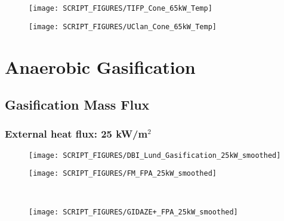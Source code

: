 \begin{landscape}
\begin{minipage}{0.65\textwidth}
\begin{figure}[H]
{\texttt{[image: SCRIPT\_FIGURES/TIFP\_Cone\_65kW\_Temp]}}\\
\end{figure}
\end{minipage}
\begin{minipage}{0.35\textwidth}
\begin{figure}[H]
{\texttt{[image: SCRIPT\_FIGURES/UClan\_Cone\_65kW\_Temp]}}\\
\end{figure}
\end{minipage}
\vfill

\section{Anaerobic Gasification}
\subsection{Gasification Mass Flux}
\label{Gas_Mass}
\subsubsection{External heat flux: 25 kW/m$^2$}
\begin{minipage}{0.65\textwidth}
\begin{figure}[H]
{\texttt{[image: SCRIPT\_FIGURES/DBI\_Lund\_Gasification\_25kW\_smoothed]}}\\
\end{figure}
\end{minipage}
\begin{minipage}{0.35\textwidth}
\begin{figure}[H]
{\texttt{[image: SCRIPT\_FIGURES/FM\_FPA\_25kW\_smoothed]}}\\
\end{figure}
\end{minipage}\\
\begin{minipage}{0.65\textwidth}
\begin{figure}[H]
{\texttt{[image: SCRIPT\_FIGURES/GIDAZE+\_FPA\_25kW\_smoothed]}}\\
\end{figure}
\end{minipage}
\vfill

\newpage

\end{landscape}
